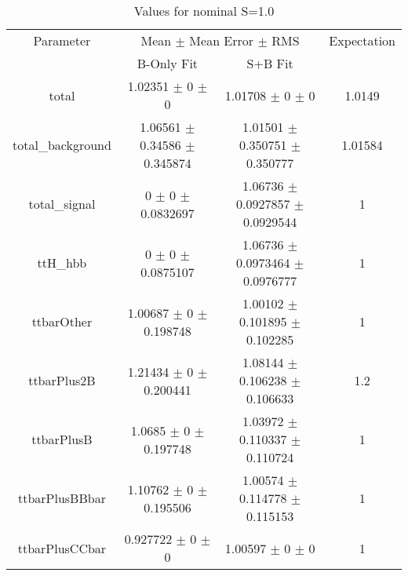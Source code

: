 \begin{table}
\centering
\caption{Values for nominal S=1.0}
\begin{tabular}{cccc}
\toprule
Parameter & \multicolumn{2}{c}{Mean $\pm$ Mean Error $\pm$ RMS} & Expectation\\
 & B-Only Fit & S+B Fit & \\
\midrule
total & \num{1.02351} $\pm$ \num{0} $\pm$ \num{0} & \num{1.01708} $\pm$ \num{0} $\pm$ \num{0} & \num{1.0149}\\
total\_background & \num{1.06561} $\pm$ \num{0.34586} $\pm$ \num{0.345874} & \num{1.01501} $\pm$ \num{0.350751} $\pm$ \num{0.350777} & \num{1.01584}\\
total\_signal & \num{0} $\pm$ \num{0} $\pm$ \num{0.0832697} & \num{1.06736} $\pm$ \num{0.0927857} $\pm$ \num{0.0929544} & \num{1}\\
ttH\_hbb & \num{0} $\pm$ \num{0} $\pm$ \num{0.0875107} & \num{1.06736} $\pm$ \num{0.0973464} $\pm$ \num{0.0976777} & \num{1}\\
ttbarOther & \num{1.00687} $\pm$ \num{0} $\pm$ \num{0.198748} & \num{1.00102} $\pm$ \num{0.101895} $\pm$ \num{0.102285} & \num{1}\\
ttbarPlus2B & \num{1.21434} $\pm$ \num{0} $\pm$ \num{0.200441} & \num{1.08144} $\pm$ \num{0.106238} $\pm$ \num{0.106633} & \num{1.2}\\
ttbarPlusB & \num{1.0685} $\pm$ \num{0} $\pm$ \num{0.197748} & \num{1.03972} $\pm$ \num{0.110337} $\pm$ \num{0.110724} & \num{1}\\
ttbarPlusBBbar & \num{1.10762} $\pm$ \num{0} $\pm$ \num{0.195506} & \num{1.00574} $\pm$ \num{0.114778} $\pm$ \num{0.115153} & \num{1}\\
ttbarPlusCCbar & \num{0.927722} $\pm$ \num{0} $\pm$ \num{0} & \num{1.00597} $\pm$ \num{0} $\pm$ \num{0} & \num{1}\\
\bottomrule
\end{tabular}
\end{table}